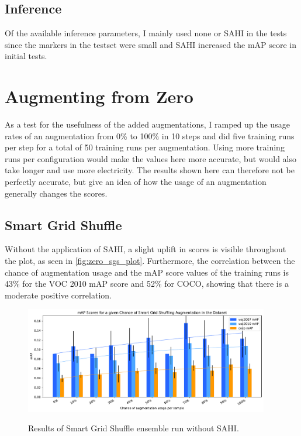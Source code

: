 \documentclass[10pt]{book}
\newcommand{\figureref}[1]{\autoref{#1}}
\begin{document}
\subsection{Inference}

Of the available inference parameters, I mainly used none or \ac{SAHI} in the tests since the markers in the testset were small and \ac{SAHI} increased the \ac{mAP} score in initial tests.

\section{Augmenting from Zero} %
\label{sec:aug_ens_zero}

As a test for the usefulness of the added augmentations, I ramped up the usage rates of an augmentation from 0\% to 100\% in 10 steps and did five training runs per step for a total of 50 training runs per augmentation. Using more training runs per configuration would make the values here more accurate, but would also take longer and use more electricity. The results shown here can therefore not be perfectly accurate, but give an idea of how the usage of an augmentation generally changes the scores.

\subsection{Smart Grid Shuffle}

Without the application of \ac{SAHI}, a slight uplift in scores is visible throughout the plot, as seen in \figureref{fig:zero_sgs_plot}. Furthermore, the correlation between the chance of augmentation usage and the \ac{mAP} score values of the training runs is 43\% for the VOC 2010 \ac{mAP} score and 52\% for \ac{COCO}, showing that there is a moderate positive correlation.

\begin{figure}
  \caption{Results of Smart Grid Shuffle ensemble run without \ac{SAHI}.}
  \includegraphics[width=0.95\textwidth]{image/zero-based-sgs-ensemble-2-thesis}
  \label{fig:zero_sgs_plot}
\end{figure}
\end{document}
